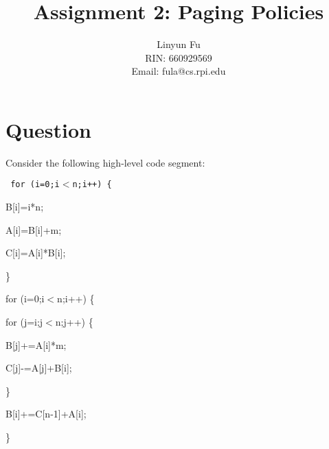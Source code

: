 \documentclass[12pt,letterpaper]{article}
\author{Linyun Fu\\RIN: 660929569\\Email: fula@cs.rpi.edu}
\title{Assignment 2: Paging Policies}
\begin{document}
\maketitle
\part*{Question}
Consider the following high-level code segment:

\vspace{1ex}

{\tt
\hspace{4em}for (i=0;i$<$n;i++) \{

\hspace{8em}B[i]=i*n;

\hspace{8em}A[i]=B[i]+m;

\hspace{8em}C[i]=A[i]*B[i];

\hspace{4em}\}

\hspace{4em}for (i=0;i$<$n;i++) \{

\hspace{8em}for (j=i;j$<$n;j++) \{

\hspace{12em}B[j]+=A[i]*m;

\hspace{12em}C[j]-=A[j]+B[i];

\hspace{8em}\}

\hspace{8em}B[i]+=C[n-1]+A[i];

\hspace{4em}\}
}
\end{document}
